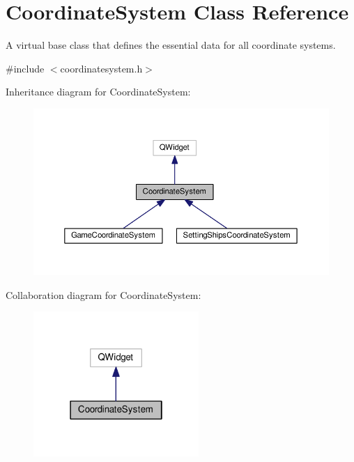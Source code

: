 \hypertarget{classGUI_1_1CoordinateSystem}{}\section{Coordinate\+System Class Reference}
\label{classGUI_1_1CoordinateSystem}


A virtual base class that defines the essential data for all coordinate systems.  




{\ttfamily \#include $<$coordinatesystem.\+h$>$}



Inheritance diagram for Coordinate\+System\+:\nopagebreak
\begin{figure}[H]
\begin{center}
\leavevmode
\includegraphics[width=350pt]{classGUI_1_1CoordinateSystem__inherit__graph}
\end{center}
\end{figure}


Collaboration diagram for Coordinate\+System\+:\nopagebreak
\begin{figure}[H]
\begin{center}
\leavevmode
\includegraphics[width=178pt]{classGUI_1_1CoordinateSystem__coll__graph}
\end{center}
\end{figure}
